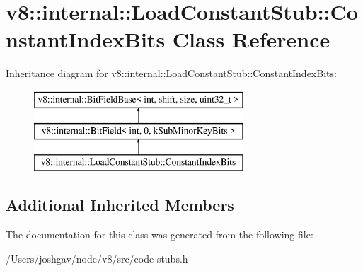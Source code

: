 \hypertarget{classv8_1_1internal_1_1_load_constant_stub_1_1_constant_index_bits}{}\section{v8\+:\+:internal\+:\+:Load\+Constant\+Stub\+:\+:Constant\+Index\+Bits Class Reference}
\label{classv8_1_1internal_1_1_load_constant_stub_1_1_constant_index_bits}
Inheritance diagram for v8\+:\+:internal\+:\+:Load\+Constant\+Stub\+:\+:Constant\+Index\+Bits\+:\begin{figure}[H]
\begin{center}
\leavevmode
\includegraphics[height=3.000000cm]{classv8_1_1internal_1_1_load_constant_stub_1_1_constant_index_bits}
\end{center}
\end{figure}
\subsection*{Additional Inherited Members}


The documentation for this class was generated from the following file\+:\begin{DoxyCompactItemize}
\item 
/\+Users/joshgav/node/v8/src/code-\/stubs.\+h\end{DoxyCompactItemize}
